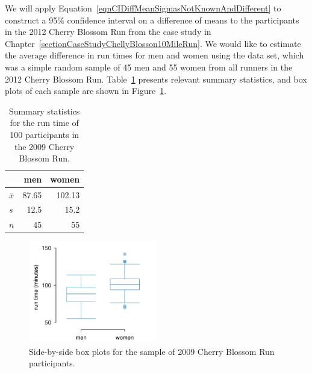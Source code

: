 
We will apply Equation~\eqref{eqnCIDiffMeanSigmasNotKnownAndDifferent} 
to construct a 95\% confidence interval on a difference of means to the participants in the 2012 Cherry Blossom Run from the case study in Chapter~\ref{sectionCaseStudyChellyBlosson10MileRun}.
We would like to estimate the average difference in run times for men and women using the  data set, which was a simple random sample of 45 men and 55 women from all runners in the 2012 Cherry Blossom Run. Table~\ref{cherryBlossomRun2009SampleOf180SummaryStats} presents relevant summary statistics, and box plots of each sample are shown in Figure~\ref{cbrRunTimesMenWomen}.

\begin{table}[H]
\centering
\begin{tabular}{l rr}
\hline
	&	men	&	women \\
\hline
$\bar{x}$	& 87.65	& 102.13 \\
$s$	&	12.5		& 15.2 \\
$n$	&	45		& 55    \\
\hline
\end{tabular}
\caption{Summary statistics for the run time of 100 participants in the 2009 Cherry Blossom Run.}
\label{cherryBlossomRun2009SampleOf180SummaryStats}
\end{table}

\begin{figure}[H]
\centering
\includegraphics[width=0.5\textwidth]{05/figures/cbrRunTimesMenWomen/cbrRunTimesMenWomen}
\caption{Side-by-side box plots for the sample of 2009 Cherry Blossom Run participants.}
\label{cbrRunTimesMenWomen}
\end{figure}

